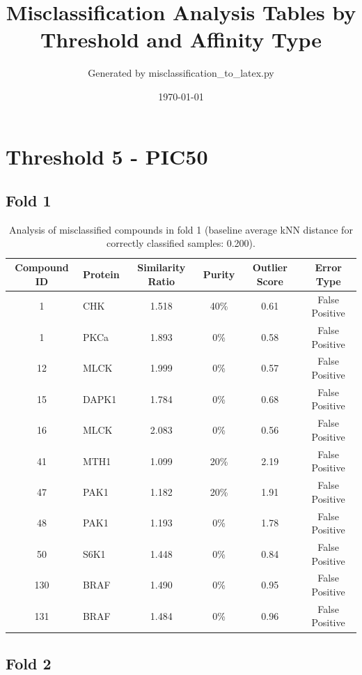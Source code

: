 \documentclass{article}
\title{Misclassification Analysis Tables by Threshold and Affinity Type}
\author{Generated by misclassification\_to\_latex.py}
\date{\today}
\newenvironment{smarttabular}[1]{%
    \begin{tabular}{#1}%
}{%
    \end{tabular}%
}
\begin{document}
\maketitle

\section{Threshold 5 - PIC50}

\subsection{Fold 1}

\begin{table}[H]
    \centering
    \small
    \caption{Analysis of misclassified compounds in fold 1 (baseline average kNN distance for correctly classified samples: 0.200).}
    \label{tab:misclassified_compounds_1}
    \begin{smarttabular}{clcccc}
        \toprule
        \textbf{Compound ID} & \textbf{Protein} & \textbf{Similarity Ratio} & \textbf{Purity} & \textbf{Outlier Score} & \textbf{Error Type} \\
        \midrule
        1 & CHK & 1.518 & 40\% & 0.61 & False Positive \\
        1 & PKCa & 1.893 & 0\% & 0.58 & False Positive \\
        12 & MLCK & 1.999 & 0\% & 0.57 & False Positive \\
        15 & DAPK1 & 1.784 & 0\% & 0.68 & False Positive \\
        16 & MLCK & 2.083 & 0\% & 0.56 & False Positive \\
        41 & MTH1 & 1.099 & 20\% & 2.19 & False Positive \\
        47 & PAK1 & 1.182 & 20\% & 1.91 & False Positive \\
        48 & PAK1 & 1.193 & 0\% & 1.78 & False Positive \\
        50 & S6K1 & 1.448 & 0\% & 0.84 & False Positive \\
        130 & BRAF & 1.490 & 0\% & 0.95 & False Positive \\
        131 & BRAF & 1.484 & 0\% & 0.96 & False Positive \\
        \bottomrule
    \end{smarttabular}
\end{table}

\clearpage

\subsection{Fold 2}
\end{document}
